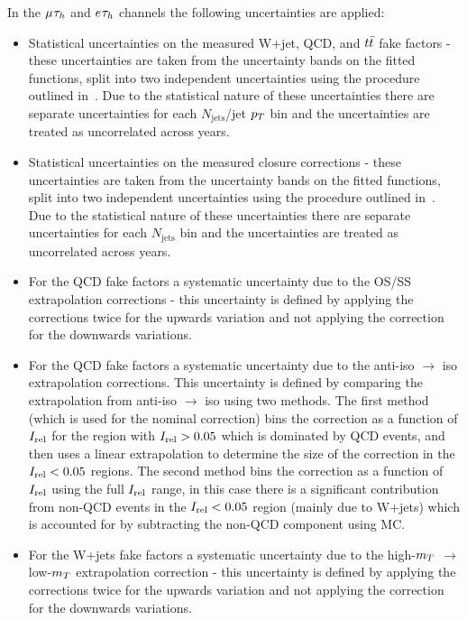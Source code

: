 \begin{itemize}
In the $\mu_{}\tau_{h}$ and $e_{}\tau_{h}$ channels the following uncertainties are applied:
\begin{itemize}
\item Statistical uncertainties on the measured W+jet, QCD, and $t\bar{t}$ fake factors - these uncertainties are taken from the uncertainty bands on the fitted functions, split into two independent uncertainties using the procedure outlined in~\cite{CPDecayAnalysis}.
Due to the statistical nature of these uncertainties there are separate uncertainties for each $N_{\text{jets}}$/jet $p_{T}$ bin and the uncertainties are treated as uncorrelated across years.
\item Statistical uncertainties on the measured closure corrections - these uncertainties are taken from the uncertainty bands on the fitted functions, split into two independent uncertainties using the procedure outlined in~\cite{CPDecayAnalysis}. 
Due to the statistical nature of these uncertainties there are separate uncertainties for each $N_{\text{jets}}$ bin and the uncertainties are treated as uncorrelated across years.
\item For the QCD fake factors a systematic uncertainty due to the OS/SS extrapolation corrections - this uncertainty is defined by applying the corrections twice for the upwards variation and not applying the correction for the downwards variations.
\item For the QCD fake factors a systematic uncertainty due to the anti-iso $\rightarrow$ iso extrapolation corrections. This uncertainty is defined by comparing the extrapolation from anti-iso $\rightarrow$ iso using two methods. The first method (which is used for the nominal correction) bins the correction as a function of $I_{\text{rel}}$ for the region with $I_{\text{rel}}>0.05$ which is dominated by QCD events, and then uses a linear extrapolation to determine the size of the correction in the $I_{\text{rel}}<0.05$ regions.
The second method bins the correction as a function of $I_{\text{rel}}$ using the full $I_{\text{rel}}$ range, in this case there is a significant contribution from non-QCD events in the $I_{\text{rel}}<0.05$ region (mainly due to W+jets) which is accounted for by subtracting the non-QCD component using MC.
\item For the W+jets fake factors a systematic uncertainty due to the high-$m_{T}$ $\rightarrow$ low-$m_{T}$ extrapolation correction - this uncertainty is defined by applying the corrections twice for the upwards variation and not applying the correction for the downwards variations. 

\end{itemize}
\end{itemize}
